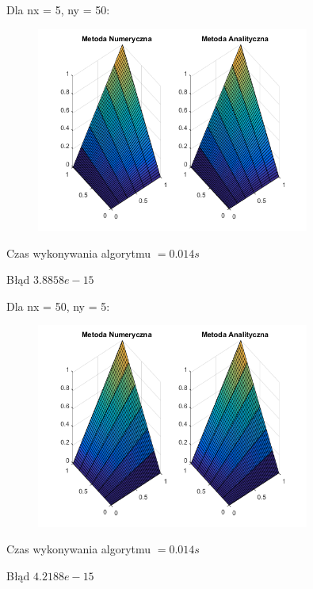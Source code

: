 Dla nx = 5, ny = 50:

\begin{figure}[!ht]
	\begin{center}
		\includegraphics[width=0.8\textwidth]{Lab5/charts/zad1/5x50.png}
	\end{center}
\end{figure}

Czas wykonywania algorytmu $ = 0.014 s$

Błąd $3.8858e-15$

Dla nx = 50, ny = 5:

\begin{figure}[!ht]
	\begin{center}
		\includegraphics[width=0.8\textwidth]{Lab5/charts/zad1/50x5.png}
	\end{center}
\end{figure}

Czas wykonywania algorytmu $ = 0.014 s$

Błąd $4.2188e-15$

\newpage


